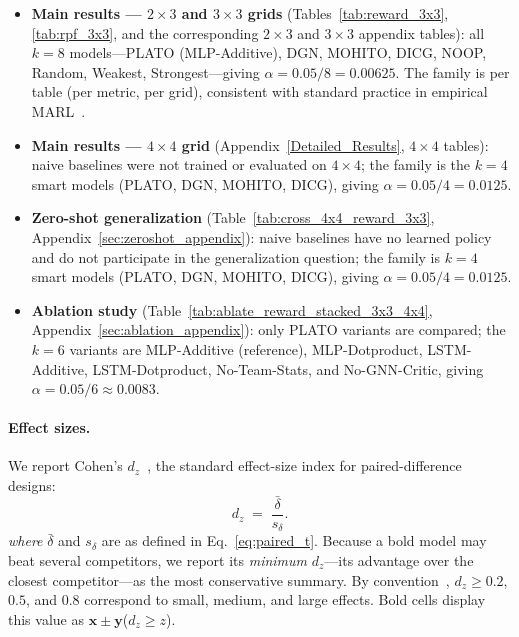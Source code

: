 \begin{itemize}%
    \item \textbf{Main results --- $2\times3$ and $3\times3$ grids} (Tables~\ref{tab:reward_3x3}, \ref{tab:rpf_3x3}, and the corresponding $2\times3$ and $3\times3$ appendix tables): all $k=8$ models---PLATO (MLP-Additive), DGN, MOHITO, DICG, NOOP, Random, Weakest, Strongest---giving $\alpha = 0.05/8 = 0.00625$. The family is per table (per metric, per grid), consistent with standard practice in empirical MARL~\cite{demsar2006statistical}.

    \item \textbf{Main results --- $4\times4$ grid} (Appendix~\ref{Detailed_Results}, $4\times4$ tables): naive baselines were not trained or evaluated on $4\times4$; the family is the $k=4$ smart models (PLATO, DGN, MOHITO, DICG), giving $\alpha = 0.05/4 = 0.0125$.

    \item \textbf{Zero-shot generalization} (Table~\ref{tab:cross_4x4_reward_3x3}, Appendix~\ref{sec:zeroshot_appendix}): naive baselines have no learned policy and do not participate in the generalization question; the family is $k=4$ smart models (PLATO, DGN, MOHITO, DICG), giving $\alpha = 0.05/4 = 0.0125$.

    \item \textbf{Ablation study} (Table~\ref{tab:ablate_reward_stacked_3x3_4x4}, Appendix~\ref{sec:ablation_appendix}): only PLATO variants are compared; the $k=6$ variants are MLP-Additive (reference), MLP-Dotproduct, LSTM-Additive, LSTM-Dotproduct, No-Team-Stats, and No-GNN-Critic, giving $\alpha = 0.05/6 \approx 0.0083$.
\end{itemize}

\paragraph{Effect sizes.}
We report Cohen's $d_z$~\cite{cohen1988statistical}, the standard effect-size index for paired-difference designs:
\begin{equation}
    d_z \;=\; \frac{\bar{\delta}}{s_{\delta}}.
    \label{eq:dz}
\end{equation}
\noindent\textit{where} $\bar{\delta}$ and $s_{\delta}$ are as defined in Eq.~\ref{eq:paired_t}.
Because a bold model may beat several competitors, we report its \emph{minimum} $d_z$---its advantage over the closest competitor---as the most conservative summary.
By convention~\cite{cohen1988statistical}, $d_z \ge 0.2$, $0.5$, and $0.8$ correspond to small, medium, and large effects.
Bold cells display this value as $\mathbf{x{\pm}y}${\scriptsize($d_z{\geq}z$)}.


